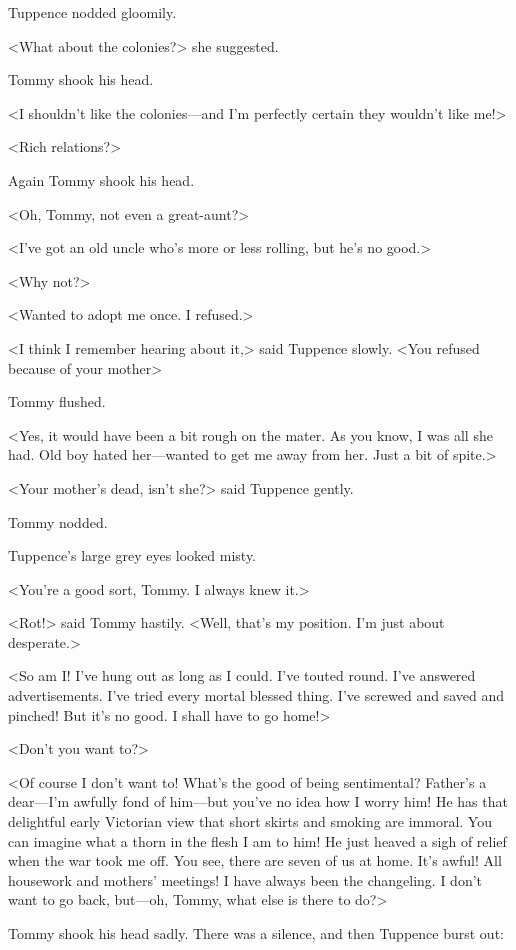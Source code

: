 Tuppence nodded gloomily.

<What about the colonies?> she suggested.

Tommy shook his head.

<I shouldn't like the colonies—and I'm perfectly certain they wouldn't like me!>

<Rich relations?>

Again Tommy shook his head.

<Oh, Tommy, not even a great-aunt?>

<I've got an old uncle who's more or less rolling, but he's no good.>

<Why not?>

<Wanted to adopt me once. I refused.>

<I think I remember hearing about it,> said Tuppence slowly. <You refused because of your mother\longdash>

Tommy flushed.

<Yes, it would have been a bit rough on the mater. As you know, I was all she had. Old boy hated her—wanted to get me away from her. Just a bit of spite.>

<Your mother's dead, isn't she?> said Tuppence gently.

Tommy nodded.

Tuppence's large grey eyes looked misty.

<You're a good sort, Tommy. I always knew it.>

<Rot!> said Tommy hastily. <Well, that's my position. I'm just about desperate.>

<So am I! I've hung out as long as I could. I've touted round. I've answered advertisements. I've tried every mortal blessed thing. I've screwed and saved and pinched! But it's no good. I shall have to go home!>

<Don't you want to?>

<Of course I don't want to! What's the good of being sentimental? Father's a dear—I'm awfully fond of him—but you've no idea how I worry him! He has that delightful early Victorian view that short skirts and smoking are immoral. You can imagine what a thorn in the flesh I am to him! He just heaved a sigh of relief when the war took me off. You see, there are seven of us at home. It's awful! All housework and mothers' meetings! I have always been the changeling. I don't want to go back, but—oh, Tommy, what else is there to do?>

Tommy shook his head sadly. There was a silence, and then Tuppence burst out:

